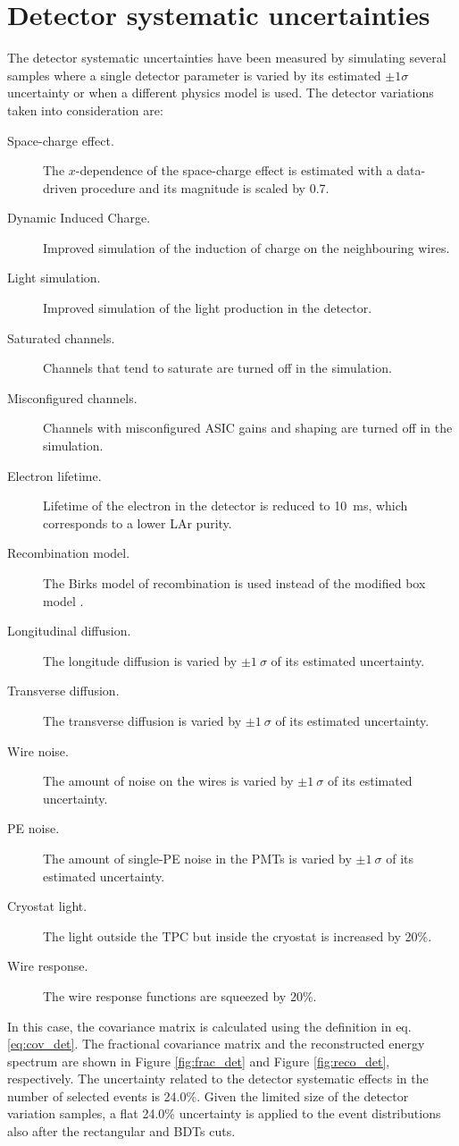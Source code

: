 \section{Detector systematic uncertainties}
The detector systematic uncertainties have been measured by simulating several samples where a single detector parameter is varied by its estimated $\pm1\sigma$ uncertainty or when a different physics model is used. The detector variations taken into consideration are:
\begin{description}
\item[Space-charge effect.] The $x$-dependence of the space-charge effect is estimated with a data-driven procedure and its magnitude is scaled by 0.7.
\item[Dynamic Induced Charge.] Improved simulation of the induction of charge on the neighbouring wires.
\item[Light simulation.] Improved simulation of the light production in the detector.
\item[Saturated channels.] Channels that tend to saturate are turned off in the simulation.
\item[Misconfigured channels.] Channels with misconfigured ASIC gains and shaping are turned off in the simulation.
\item[Electron lifetime.] Lifetime of the electron in the detector is reduced to 10~ms, which corresponds to a lower LAr purity.
\item[Recombination model.] The Birks model of recombination \cite{Amoruso:2004dy} is used instead of the modified box model \cite{Acciarri:2013met}. 
\item[Longitudinal diffusion.] The longitude diffusion is varied by $\pm1~\sigma$ of its estimated uncertainty.
\item[Transverse diffusion.] The transverse diffusion is varied by $\pm1~\sigma$ of its estimated uncertainty.
\item[Wire noise.] The amount of noise on the wires is varied by $\pm1~\sigma$ of its estimated uncertainty.
\item[PE noise.] The amount of single-PE noise in the PMTs is varied by $\pm1~\sigma$ of its estimated uncertainty.
\item[Cryostat light.] The light outside the TPC but inside the cryostat is increased by 20\%.
\item[Wire response.] The wire response functions are squeezed by 20\%.
\end{description}

In this case, the covariance matrix is calculated using the definition in eq. \eqref{eq:cov_det}. The fractional covariance matrix and the reconstructed energy spectrum are shown in Figure \ref{fig:frac_det} and Figure \ref{fig:reco_det}, respectively.
The uncertainty related to the detector systematic effects in the number of selected events is 24.0\%. Given the limited size of the detector variation samples, a flat 24.0\% uncertainty is applied to the event distributions also after the rectangular and BDTs cuts. %

